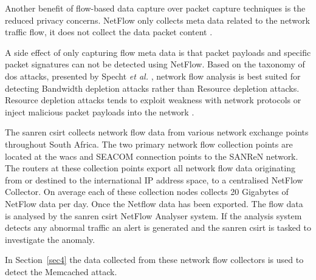 Another benefit of flow-based data capture over packet capture techniques is the reduced privacy concerns. NetFlow only collects meta data related to the network traffic flow, it does not collect the data packet content \cite{hofstede2014flow}. 

A side effect of only capturing flow meta data is that packet payloads and specific packet signatures can not be detected using NetFlow. Based on the taxonomy of \gls{dos} attacks, presented by Specht \textit{et al.} \cite{specht2004distributed}, network flow analysis is best suited for detecting Bandwidth depletion attacks rather than Resource depletion attacks. Resource depletion attacks tends to exploit weakness with network protocols or inject malicious packet payloads into the network  \cite{specht2004distributed}.

The \gls{sanren} \gls{csirt} collects network flow data from various network exchange points throughout South Africa. The two primary network flow collection points are located at the \gls{wacs} and SEACOM connection points to the SANReN network. The routers at these collection points export all network flow data originating from or destined to the international IP address space, to a centralised NetFlow Collector. On average each of these collection nodes collects 20 Gigabytes of NetFlow data per day. Once the Netflow data has been exported. The flow data is analysed by the \gls{sanren} \gls{csirt} NetFlow Analyser system. If the analysis system detects any abnormal traffic an alert is generated and the \gls{sanren} \gls{csirt} is tasked to investigate the anomaly.

In Section~\ref{sec4} the data collected from these network flow collectors is used to detect the Memcached attack.

